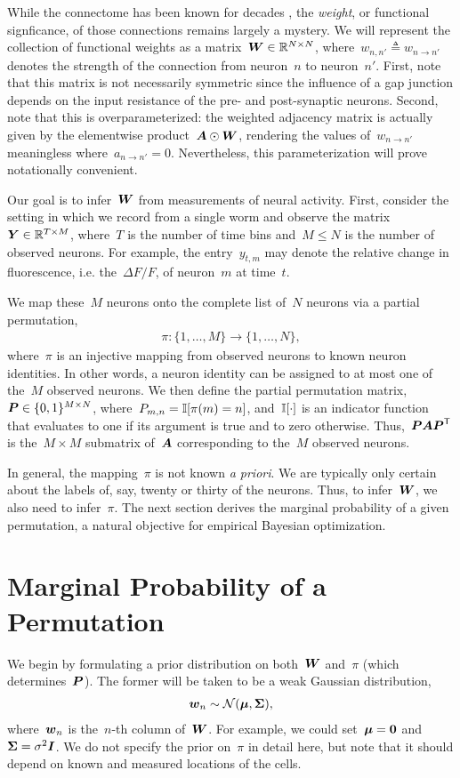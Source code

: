While the connectome has been known for decades \citep{white1986structure},
the \emph{weight}, or functional signficance, of those connections
remains largely a mystery. We will represent the collection of
functional weights as a matrix~${\boldsymbol{W} \in \mathbb{R}^{N \times N}}$,
where~$w_{n,n'} \triangleq w_{n \to n'}$ denotes the strength
of the connection from neuron~$n$ to neuron~$n'$. First, note
that this matrix is not necessarily symmetric since the influence
of a gap junction depends on the input resistance of the pre-
and post-synaptic neurons. Second, note that this is overparameterized:
the weighted adjacency matrix is actually given by the elementwise
product~$\boldsymbol{A} \odot \boldsymbol{W}$, rendering the values of~$w_{n \to n'}$
meaningless where~$a_{n \to n'}=0$. Nevertheless, this parameterization
will prove notationally convenient.

Our goal is to infer~$\boldsymbol{W}$ from measurements of neural activity. 
First, consider the setting in which we record from a single worm
and observe the matrix~$\boldsymbol{Y} \in \mathbb{R}^{T \times M}$,
where~$T$ is the number of time bins and~$M \leq N$ is the number of
observed neurons. For example, the entry~$y_{t,m}$ may denote the relative change in
fluorescence, i.e. the~${\Delta F/F}$, of neuron~$m$ at time~$t$.

We map these~$M$ neurons onto the complete list of~$N$ neurons
via a partial permutation,
\begin{align*}
\pi: \{1, \ldots, M\} \to \{1, \ldots, N\},
\end{align*}
where~$\pi$ is an injective mapping from observed neurons to known
neuron identities. In other words, a neuron identity can be assigned to at most one of
the~$M$ observed neurons.
We then define the partial permutation matrix,~$\boldsymbol{P} \in \{0,1\}^{M \times N}$,
where~${P_{m,n} = \mathbb{I}[\pi(m)=n]}$, and~$\mathbb{I}[\cdot]$ is an indicator
function that evaluates to one if its argument is true and to zero otherwise.
Thus,~$\boldsymbol{P} \boldsymbol{A} \boldsymbol{P}^{\mathsf{T}}$ is the~$M \times M$ submatrix
of~$\boldsymbol{A}$ corresponding to the~$M$ observed neurons.

In general, the mapping~$\pi$ is not known \emph{a priori}. We are typically
only certain about the labels of, say, twenty or thirty of the neurons.
Thus, to infer~$\boldsymbol{W}$, we also need to infer~$\pi$. The next section
derives the marginal probability of a given permutation, a
natural objective for empirical Bayesian optimization.

\section{Marginal Probability of a Permutation}
We begin by formulating a prior distribution on both~$\boldsymbol{W}$ and~$\pi$
(which determines~$\boldsymbol{P}$).
The former will be taken to be a weak Gaussian distribution,
\begin{align*}
 \boldsymbol{w}_n \sim \mathcal{N}(\boldsymbol{\mu}, \boldsymbol{\Sigma}), 
\end{align*}
where~$\boldsymbol{w}_n$ is the~$n$-th column of~$\boldsymbol{W}$. For example, we could
set~$\boldsymbol{\mu} = \boldsymbol{0}$ and~$\boldsymbol{\Sigma} = \sigma^2 \boldsymbol{I}$.
We do not specify the prior on~$\pi$ in detail here, but note that
it should depend on known and measured locations of the cells.

